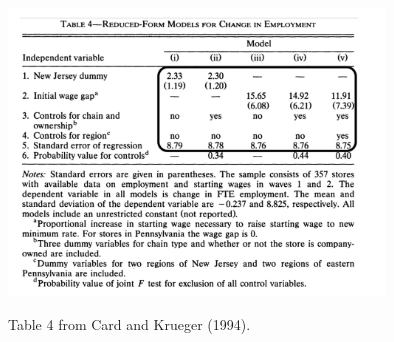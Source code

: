 \documentclass[
]{article}
\begin{document}
\begin{table}[!htb]
\centering
  \includegraphics[width=0.75\textwidth]{figures/CardKrueger_Table4.png}
  \caption{Table 4 from Card and Krueger (1994).}
  \label{fig:CK_Tab4}
\end{table}
\end{document}
